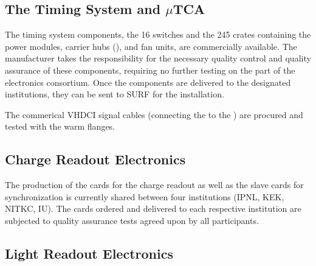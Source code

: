 \subsection{The Timing System and $\mu$TCA}
\label{sec:fddp-tpc-elec-prod-utca}

The timing system components, the  \num{16}  switches and the \num{245}  crates containing the power modules, carrier hubs (), and fan units,  %
are commercially available. The manufacturer takes the responsibility for the necessary quality control and quality assurance of these components, requiring no further testing on the part of the \dual electronics consortium. Once the components are delivered to the designated institutions, they can be sent to SURF for the installation. 

The commerical VHDCI signal cables (connecting the  to the ) are procured and tested with the  warm flanges.



\subsection{Charge Readout Electronics}
\label{sec:fddp-tpc-elec-prod-cro}
The production of the  cards for the charge readout as well as the  slave cards for synchronization is currently shared between four institutions (IPNL, KEK, NITKC, IU). The cards ordered and delivered to each respective institution are subjected to quality assurance tests agreed upon by all participants.  

\subsection{Light Readout Electronics}
\label{sec:fddp-tpc-elec-prod-lro}

